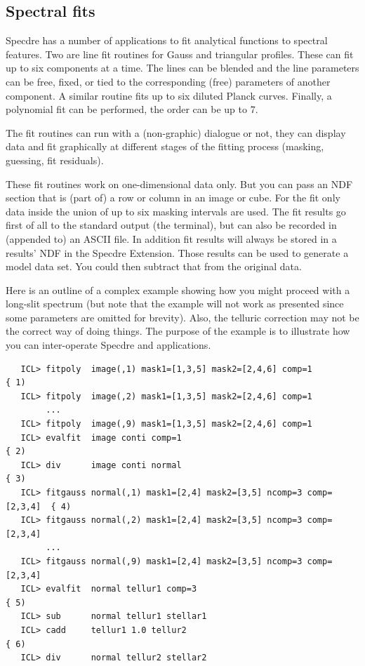 
\subsection{\label{specdrespecfit}Spectral fits}

   Specdre has a number of applications to fit analytical functions to
   spectral features. Two are line fit routines for Gauss and triangular
   profiles. These can fit up to six components at a time. The lines can
   be blended and the line parameters can be free, fixed, or tied to the
   corresponding (free) parameters of another component. A similar
   routine fits up to six diluted Planck curves.  Finally, a polynomial
   fit can be performed, the order can be up to 7.

   The fit routines can run with a (non-graphic) dialogue or not, they
   can display data and fit graphically at different stages of the
   fitting process (masking, guessing, fit residuals).

   These fit routines work on one-dimensional data only. But you can
   pass an NDF section that is (part of) a row or column in an image or
   cube. For the fit only data inside the union of up to six masking
   intervals are used. The fit results go first of all to the standard
   output (the terminal), but can also be recorded in (appended to) an
   ASCII file. In addition fit results will always be stored in a
   results' NDF in the Specdre Extension. Those results can be used to
   generate a model data set. You could then subtract that from the
   original data.

   Here is an outline of a complex example showing how you might proceed
   with a long-slit spectrum (but note that the example will not work 
   as presented since some parameters are omitted for brevity).  Also,
   the telluric correction may not be the correct way of doing
   things. The purpose of the example is to illustrate how you can
   inter-operate Specdre and  applications.

\begin{verbatim}
   ICL> fitpoly  image(,1) mask1=[1,3,5] mask2=[2,4,6] comp=1             { 1)
   ICL> fitpoly  image(,2) mask1=[1,3,5] mask2=[2,4,6] comp=1
        ...
   ICL> fitpoly  image(,9) mask1=[1,3,5] mask2=[2,4,6] comp=1
   ICL> evalfit  image conti comp=1                                       { 2)
   ICL> div      image conti normal                                       { 3)
   ICL> fitgauss normal(,1) mask1=[2,4] mask2=[3,5] ncomp=3 comp=[2,3,4]  { 4)
   ICL> fitgauss normal(,2) mask1=[2,4] mask2=[3,5] ncomp=3 comp=[2,3,4]
        ...
   ICL> fitgauss normal(,9) mask1=[2,4] mask2=[3,5] ncomp=3 comp=[2,3,4]
   ICL> evalfit  normal tellur1 comp=3                                    { 5)
   ICL> sub      normal tellur1 stellar1
   ICL> cadd     tellur1 1.0 tellur2                                      { 6)
   ICL> div      normal tellur2 stellar2
\end{verbatim}

